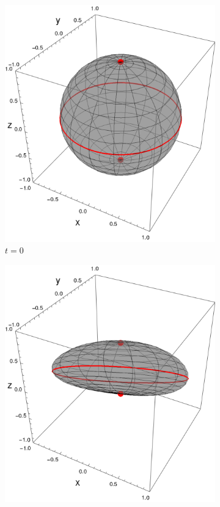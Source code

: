   \begin{figure}[ht!]
  \centering
  \begin{subfigure}{0.32\textwidth}
    \centering
    \includegraphics[width=0.9\linewidth]{chapter3/figures_toy/sphere_CNOT_t=0._r=0.9_p=0.1.png}
    \caption{$t=0$}
  \end{subfigure}%
  \begin{subfigure}{0.32\textwidth}
    \centering
    \includegraphics[width=0.9\linewidth]{chapter3/figures_toy/sphere_CNOT_t=0.5_r=0.9_p=0.1.png}

\end{subfigure}
\end{figure}
